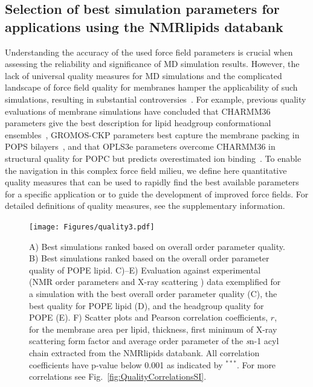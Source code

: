 \documentclass[fleqn,10pt]{wlscirep}
\begin{document}
\subsection{Selection of best simulation parameters for applications using the NMRlipids databank}
Understanding the accuracy of the used force field parameters is crucial when assessing the reliability and significance of MD simulation results. However, the lack of universal quality measures for MD simulations and the complicated landscape of force field quality for membranes hamper the applicability of such simulations, resulting in substantial controversies~\cite{antila22b}. For example, previous quality evaluations of membrane simulations have concluded that CHARMM36 parameters give the best description for lipid headgroup conformational ensembles~\cite{bacle21}, GROMOS-CKP parameters best capture the membrane packing in POPS bilayers~\cite{antila22b}, and that OPLS3e parameters overcome CHARMM36 in structural quality for POPC but predicts overestimated ion binding~\cite{kurki22}. To enable the navigation in this complex force field milieu, we define here quantitative quality measures that can be used to rapidly find the best available parameters for a specific application or to guide the development of improved force fields. For detailed definitions of quality measures, see the supplementary information.

\begin{figure}[!t]
    \centering
    \texttt{[image: Figures/quality3.pdf]}
    \caption{ A) Best simulations ranked based on overall order parameter quality.
    B) Best simulations ranked based on the overall order parameter quality of POPE lipid. 
    C)--E) Evaluation against experimental (NMR order parameters and X-ray scattering ) data exemplified for a simulation with the best overall order parameter quality (C), the best quality for POPE lipid (D), and the headgroup quality for POPE (E).
    F) Scatter plots and Pearson correlation coefficients, $r$, for the membrane area per lipid, thickness, first minimum of X-ray scattering form factor and average order parameter of the {\textit sn}-1 acyl chain extracted from the NMRlipids databank. All correlation coefficients have p-value below 0.001 as indicated by $^{***}$. For more correlations see Fig.~\ref{fig:QualityCorrelationsSI}.
    }
    \label{fig:quality}
\end{figure}
\end{document}
